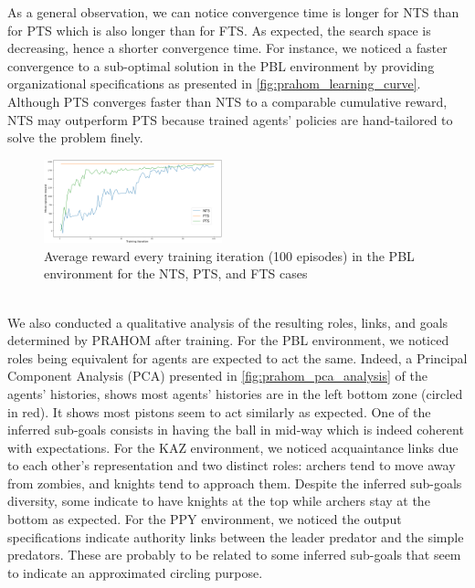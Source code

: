 \documentclass[runningheads]{llncs}
\begin{document}



As a general observation, we can notice convergence time is longer for NTS than for PTS which is also longer than for FTS. As expected, the search space is decreasing, hence a shorter convergence time. For instance, we noticed a faster convergence to a sub-optimal solution in the PBL environment by providing organizational specifications as presented in \autoref{fig:prahom_learning_curve}. Although PTS converges faster than NTS to a comparable cumulative reward, NTS may outperform PTS because trained agents' policies are hand-tailored to solve the problem finely.
%
%
% 
%
%
%
\begin{figure}[h!]
    \centering
    \includegraphics[width=0.46\textwidth]{figures/prahom_learning_curve.png}
    \caption{Average reward every training iteration (100 episodes) in the PBL environment for the NTS, PTS, and FTS cases\\ \phantom{X} \\}
    \label{fig:prahom_learning_curve}
\end{figure}

We also conducted a qualitative analysis of the resulting roles, links, and goals determined by PRAHOM after training.
%
For the PBL environment, we noticed roles being equivalent for agents are expected to act the same. Indeed, a Principal Component Analysis (PCA) presented in \autoref{fig:prahom_pca_analysis} of the agents' histories, shows most agents’ histories are in the left bottom zone (circled in red). It shows most pistons seem to act similarly as expected. One of the inferred sub-goals consists in having the ball in mid-way which is indeed coherent with expectations.
%
For the KAZ environment, we noticed acquaintance links due to each other's representation and two distinct roles: archers tend to move away from zombies, and knights tend to approach them. Despite the inferred sub-goals diversity, some indicate to have knights at the top while archers stay at the bottom as expected.
%
For the PPY environment, we noticed the output specifications indicate authority links between the leader predator and the simple predators. These are probably to be related to some inferred sub-goals that seem to indicate an approximated circling purpose.
\end{document}
